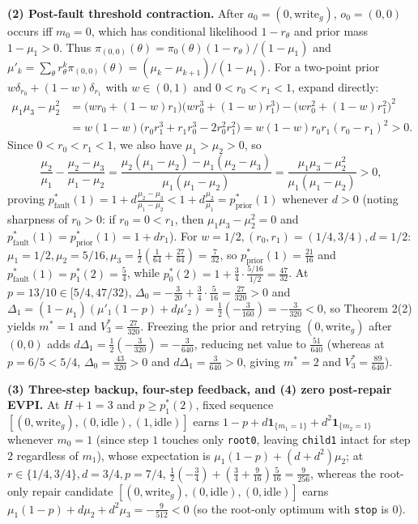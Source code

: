 \documentclass[11pt,a4paper]{article}
\begin{document}
\textbf{(2) Post-fault threshold contraction.} After
\(a_0 = (0, \mathrm{write}_g)\), \(o_0 = (0,0)\) occurs iff \(m_0 = 0\),
which has conditional likelihood \(1 - r_\theta\) and prior mass
\(1 - \mu_1 > 0\). Thus
\(\pi_{(0,0)}(\theta) = \pi_0(\theta)(1 - r_\theta)/(1 - \mu_1)\) and
\(\mu'_k = \sum_\theta r_\theta^k \pi_{(0,0)}(\theta) = (\mu_k - \mu_{k+1})/(1 - \mu_1)\).
For a two-point prior \(w \delta_{r_0} + (1-w)\delta_{r_1}\) with
\(w \in (0,1)\) and \(0 < r_0 < r_1 < 1\), expand directly:
\[\begin{aligned}
\mu_1 \mu_3 - \mu_2^2
&= \bigl(w r_0 + (1-w)r_1\bigr)\bigl(w r_0^3 + (1-w)r_1^3\bigr) - \bigl(w r_0^2 + (1-w)r_1^2\bigr)^2 \\
&= w(1-w)\bigl(r_0 r_1^3 + r_1 r_0^3 - 2 r_0^2 r_1^2\bigr)
= w(1-w) r_0 r_1 (r_0 - r_1)^2 > 0.
\end{aligned}\] Since \(0 < r_0 < r_1 < 1\), we also have
\(\mu_1 > \mu_2 > 0\), so
\[\frac{\mu_2}{\mu_1} - \frac{\mu_2 - \mu_3}{\mu_1 - \mu_2}
= \frac{\mu_2(\mu_1 - \mu_2) - \mu_1(\mu_2 - \mu_3)}{\mu_1(\mu_1 - \mu_2)}
= \frac{\mu_1 \mu_3 - \mu_2^2}{\mu_1(\mu_1 - \mu_2)} > 0,\] proving
\(p_{\mathrm{fault}}^*(1) = 1 + d\frac{\mu_2 - \mu_3}{\mu_1 - \mu_2} < 1 + d\frac{\mu_2}{\mu_1} = p_{\mathrm{prior}}^*(1)\)
whenever \(d > 0\) (noting sharpness of \(r_0 > 0\): if
\(r_0 = 0 < r_1\), then \(\mu_1\mu_3 - \mu_2^2 = 0\) and
\(p_{\mathrm{fault}}^*(1) = p_{\mathrm{prior}}^*(1) = 1 + d r_1\)). For
\(w = 1/2, (r_0, r_1) = (1/4, 3/4), d = 1/2\):
\(\mu_1 = 1/2, \mu_2 = 5/16, \mu_3 = \frac{1}{2}(\frac{1}{64} + \frac{27}{64}) = \frac{7}{32}\),
so \(p_{\mathrm{prior}}^*(1) = \frac{21}{16}\) and
\(p_{\mathrm{fault}}^*(1) = p_1^*(2) = \frac{5}{4}\), while
\(p_0^*(2) = 1 + \frac{3}{4}\cdot\frac{5/16}{1/2} = \frac{47}{32}\). At
\(p = 13/10 \in [5/4, 47/32)\),
\(\Delta_0 = -\frac{3}{20} + \frac{3}{4}\cdot\frac{5}{16} = \frac{27}{320} > 0\)
and
\(\Delta_1 = (1 - \mu_1)(\mu'_1(1-p) + d\mu'_2) = \frac{1}{2}(-\frac{3}{160}) = -\frac{3}{320} < 0\),
so Theorem 2(2) yields \(m^* = 1\) and \(V_3^* = \frac{27}{320}\).
Freezing the prior and retrying \((0, \mathrm{write}_g)\) after
\((0,0)\) adds
\(d\Delta_1 = \frac{1}{2}(-\frac{3}{320}) = -\frac{3}{640}\), reducing
net value to \(\frac{51}{640}\) (whereas at \(p = 6/5 < 5/4\),
\(\Delta_0 = \frac{43}{320} > 0\) and \(d\Delta_1 = \frac{3}{640} > 0\),
giving \(m^* = 2\) and \(V_3^* = \frac{89}{640}\)).

\textbf{(3) Three-step backup, four-step feedback, and (4) zero
post-repair EVPI.} At \(H+1 = 3\) and \(p \ge p_1^*(2)\), fixed sequence
\([(0, \mathrm{write}_g), (0, \mathrm{idle}), (1, \mathrm{idle})]\)
earns \(1 - p + d\mathbf{1}_{\{m_1=1\}} + d^2\mathbf{1}_{\{m_2=1\}}\)
whenever \(m_0 = 1\) (since step \(1\) touches only \texttt{root0},
leaving \texttt{child1} intact for step \(2\) regardless of \(m_1\)),
whose expectation is \(\mu_1(1-p) + (d + d^2)\mu_2\); at
\(r \in \{1/4, 3/4\}, d = 3/4, p = 7/4\),
\(\frac{1}{2}(-\frac{3}{4}) + (\frac{3}{4} + \frac{9}{16})\frac{5}{16} = \frac{9}{256}\),
whereas the root-only repair candidate
\([(0,\mathrm{write}_g),(0,\mathrm{idle}),(0,\mathrm{idle})]\) earns
\(\mu_1(1-p) + d\mu_2 + d^2\mu_3 = -\frac{9}{512} < 0\) (so the
root-only optimum with \texttt{stop} is \(0\)).
\end{document}
